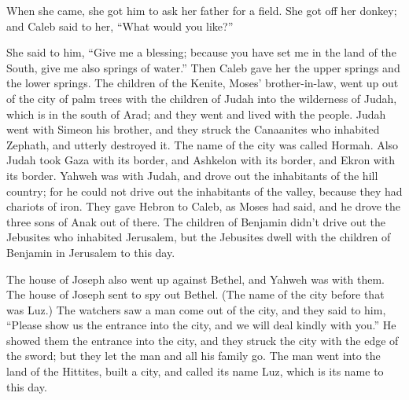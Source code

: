  When she came, she got him to ask her father for a
field. She got off her donkey; and Caleb said to her, ``What would you
like?''

 She said to him, ``Give me a blessing; because you have
set me in the land of the South, give me also springs of water.'' Then
Caleb gave her the upper springs and the lower springs. 
The children of the Kenite, Moses' brother-in-law, went up out of the
city of palm trees with the children of Judah into the wilderness of
Judah, which is in the south of Arad; and they went and lived with the
people.  Judah went with Simeon his brother, and they
struck the Canaanites who inhabited Zephath, and utterly destroyed it.
The name of the city was called Hormah.  Also Judah took
Gaza with its border, and Ashkelon with its border, and Ekron with its
border.  Yahweh was with Judah, and drove out the
inhabitants of the hill country; for he could not drive out the
inhabitants of the valley, because they had chariots of iron.
 They gave Hebron to Caleb, as Moses had said, and he
drove the three sons of Anak out of there.  The children
of Benjamin didn't drive out the Jebusites who inhabited Jerusalem, but
the Jebusites dwell with the children of Benjamin in Jerusalem to this
day.

 The house of Joseph also went up against Bethel, and
Yahweh was with them.  The house of Joseph sent to spy
out Bethel. (The name of the city before that was Luz.) 
The watchers saw a man come out of the city, and they said to him,
``Please show us the entrance into the city, and we will deal kindly
with you.''  He showed them the entrance into the city,
and they struck the city with the edge of the sword; but they let the
man and all his family go.  The man went into the land of
the Hittites, built a city, and called its name Luz, which is its name
to this day.

